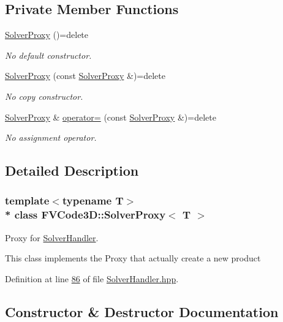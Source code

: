 \subsection*{Private Member Functions}
\begin{DoxyCompactItemize}
\item 
\hyperlink{classFVCode3D_1_1SolverProxy_a5c2f01250efd16636698aa0ee8d59df6}{Solver\+Proxy} ()=delete
\begin{DoxyCompactList}\small\item\em No default constructor. \end{DoxyCompactList}\item 
\hyperlink{classFVCode3D_1_1SolverProxy_a3f2d3829b991e1b03e277e578fd584bb}{Solver\+Proxy} (const \hyperlink{classFVCode3D_1_1SolverProxy}{Solver\+Proxy} \&)=delete
\begin{DoxyCompactList}\small\item\em No copy constructor. \end{DoxyCompactList}\item 
\hyperlink{classFVCode3D_1_1SolverProxy}{Solver\+Proxy} \& \hyperlink{classFVCode3D_1_1SolverProxy_aa83c9ad4494697e58fe1ddcef63392d6}{operator=} (const \hyperlink{classFVCode3D_1_1SolverProxy}{Solver\+Proxy} \&)=delete
\begin{DoxyCompactList}\small\item\em No assignment operator. \end{DoxyCompactList}\end{DoxyCompactItemize}


\subsection{Detailed Description}
\subsubsection*{template$<$typename T$>$\\*
class F\+V\+Code3\+D\+::\+Solver\+Proxy$<$ T $>$}

Proxy for \hyperlink{classFVCode3D_1_1SolverHandler}{Solver\+Handler}. 

This class implements the Proxy that actually create a new product 

Definition at line \hyperlink{SolverHandler_8hpp_source_l00086}{86} of file \hyperlink{SolverHandler_8hpp_source}{Solver\+Handler.\+hpp}.



\subsection{Constructor \& Destructor Documentation}
